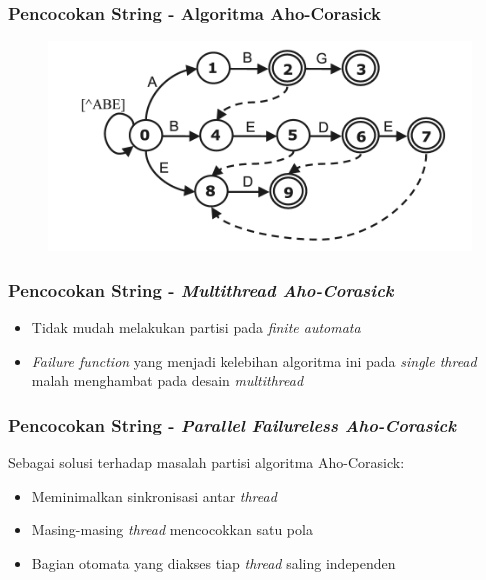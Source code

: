 \documentclass{beamer}
\begin{document}

  \begin{frame}
  \frametitle{Pencocokan String - Algoritma Aho-Corasick}
  \begin{figure}
    \includegraphics[width=0.8\linewidth]{../src/resources/aho-c.png}
  \end{figure}
  \end{frame}
  

  \begin{frame}
  \frametitle{Pencocokan String - \emph{Multithread Aho-Corasick}}
  \begin{itemize}
    \item Tidak mudah melakukan partisi pada \emph{finite automata}
    \item \emph{Failure function} yang menjadi kelebihan algoritma ini pada \emph{single thread} malah menghambat pada desain \emph{multithread}
  \end{itemize}
  \end{frame}


  \begin{frame}
  \frametitle{Pencocokan String - \emph{Parallel Failureless Aho-Corasick}}
  Sebagai solusi terhadap masalah partisi algoritma Aho-Corasick:
  \begin{itemize}
    \item Meminimalkan sinkronisasi antar \emph{thread}
    \item Masing-masing \emph{thread} mencocokkan satu pola
    \item Bagian otomata yang diakses tiap \emph{thread} saling independen
  \end{itemize}
  \end{frame}

\end{document}
